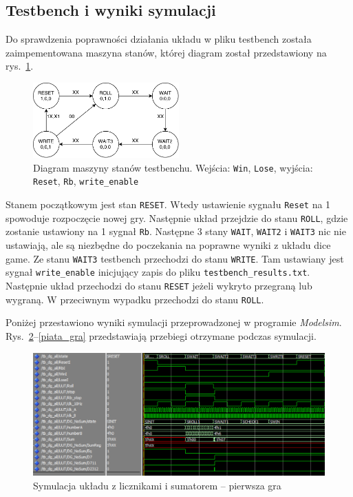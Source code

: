\documentclass[a4paper,11pt,fleqn]{article}
\begin{document}
\subsection{Testbench i wyniki symulacji}

Do sprawdzenia poprawności działania układu w pliku testbench została zaimpementowana maszyna stanów, której diagram został przedstawiony na rys.~\ref{testbenchAllDiagram}.

\begin{figure}[h!]
\centering
\includegraphics[width=0.5\textwidth]{diagrams/testbenchAllDiagram.pdf}
\caption{Diagram maszyny stanów testbenchu. Wejścia: \texttt{Win}, \texttt{Lose}, wyjścia: \texttt{Reset}, \texttt{Rb}, \texttt{write\_enable}}
\label{testbenchAllDiagram}
\end{figure}

Stanem początkowym jest stan \texttt{RESET}. Wtedy ustawienie sygnału \texttt{Reset} na 1 spowoduje rozpoczęcie nowej gry. Następnie układ przejdzie do stanu \texttt{ROLL}, gdzie zostanie ustawiony na 1 sygnał \texttt{Rb}. Następne 3 stany \texttt{WAIT}, \texttt{WAIT2} i \texttt{WAIT3} nic nie ustawiają, ale są niezbędne do poczekania na poprawne wyniki z układu dice game. Ze stanu \texttt{WAIT3} testbench przechodzi do stanu \texttt{WRITE}. Tam ustawiany jest sygnał \texttt{write\_enable} inicjujący zapis do pliku \texttt{testbench\_results.txt}. Następnie układ przechodzi do stanu \texttt{RESET} jeżeli wykryto przegraną lub wygraną. W przeciwnym wypadku przechodzi do stanu \texttt{ROLL}. 

Poniżej przestawiono wyniki symulacji przeprowadzonej w programie \textit{Modelsim}. Rys.~\ref{pierwsza_gra}--\ref{piata_gra} przedstawiają przebiegi otrzymane podczas symulacji.

\begin{figure}[h]
\centering
\includegraphics[scale = 0.5]{screens/pierwsza_gra.png}
\caption{Symulacja układu z licznikami i sumatorem -- pierwsza gra}
\label{pierwsza_gra}
\end{figure}
\end{document}

